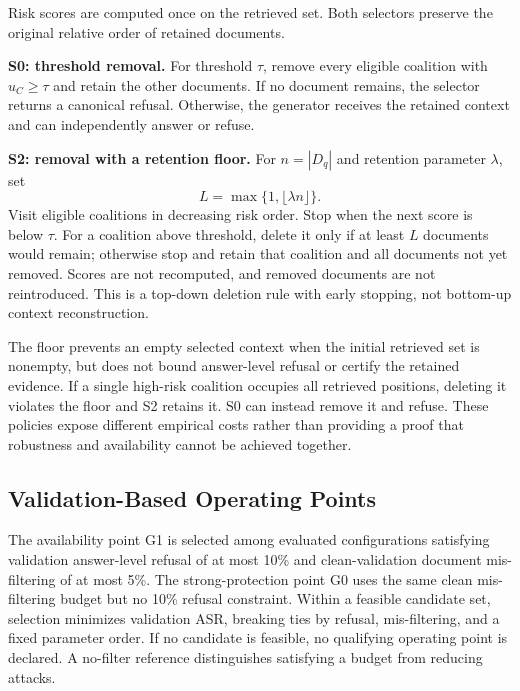 \documentclass[sigconf]{acmart}
\begin{document}
Risk scores are computed once on the retrieved set. Both selectors preserve the original relative order of retained documents.

\textbf{S0: threshold removal.} For threshold $\tau$, remove every eligible coalition with $u_C\geq\tau$ and retain the other documents. If no document remains, the selector returns a canonical refusal. Otherwise, the generator receives the retained context and can independently answer or refuse.

\textbf{S2: removal with a retention floor.} For $n=|D_q|$ and retention parameter $\lambda$, set
\begin{equation}
 L=\max\{1,\lfloor\lambda n\rfloor\}.
 \label{eq:floor}
\end{equation}
Visit eligible coalitions in decreasing risk order. Stop when the next score is below $\tau$. For a coalition above threshold, delete it only if at least $L$ documents would remain; otherwise stop and retain that coalition and all documents not yet removed. Scores are not recomputed, and removed documents are not reintroduced. This is a top-down deletion rule with early stopping, not bottom-up context reconstruction.

The floor prevents an empty selected context when the initial retrieved set is nonempty, but does not bound answer-level refusal or certify the retained evidence. If a single high-risk coalition occupies all retrieved positions, deleting it violates the floor and S2 retains it. S0 can instead remove it and refuse. These policies expose different empirical costs rather than providing a proof that robustness and availability cannot be achieved together.

\subsection{Validation-Based Operating Points}
\label{sec:calibration}

The availability point G1 is selected among evaluated configurations satisfying validation answer-level refusal of at most 10\% and clean-validation document mis-filtering of at most 5\%. The strong-protection point G0 uses the same clean mis-filtering budget but no 10\% refusal constraint. Within a feasible candidate set, selection minimizes validation ASR, breaking ties by refusal, mis-filtering, and a fixed parameter order. If no candidate is feasible, no qualifying operating point is declared. A no-filter reference distinguishes satisfying a budget from reducing attacks.
\end{document}
